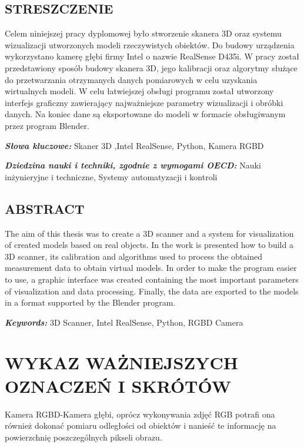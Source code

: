 \documentclass{pginz}
\providecommand{\keywordspl}[1]
{
  \small	
  \textbf{\textit{Słowa kluczowe:}} #1
}
\providecommand{\keywordseng}[1]
{
  \small	
  \textbf{\textit{Keywords:}} #1 
}
\providecommand{\dnauki}[1]
{
  \small	
  \textbf{\textit{Dziedzina nauki i techniki, zgodnie z wymogami OECD:}} #1
}
\begin{document}




\setcounter{page}{3}

 
\section*{STRESZCZENIE}
Celem niniejszej pracy dyplomowej było stworzenie skanera 3D oraz systemu wizualizacji utworzonych modeli rzeczywistych obiektów. Do budowy urządzenia wykorzystano kamerę głębi firmy Intel o nazwie RealSense D435i. W pracy został przedstawiony sposób budowy skanera 3D, jego kalibracji oraz algorytmy służące do przetwarzania otrzymanych danych pomiarowych w celu uzyskania wirtualnych modeli. W celu łatwiejszej obsługi programu został utworzony interfejs graficzny zawierający najważniejsze parametry wizualizacji i obróbki danych. Na koniec dane są eksportowane do modeli w formacie obsługiwanym przez program Blender.

\keywordspl{Skaner 3D ,Intel RealSense, Python, Kamera RGBD}

\dnauki{Nauki inżynieryjne i techniczne, Systemy automatyzacji i kontroli }

\section*{ABSTRACT}
The aim of this thesis was to create a 3D scanner and a system for visualization of created models based on real objects. In the work is presented how to build a 3D scanner, its calibration and algorithms used to process the obtained measurement data to obtain virtual models. In order to make the program easier to use, a graphic interface was created containing the most important parameters of visualization and data processing. Finally, the data are exported to the models in a format supported by the Blender program.

\keywordseng{3D Scanner, Intel RealSense, Python, RGBD Camera}
\newpage
\tableofcontents


\newpage

\chapter{WYKAZ WAŻNIEJSZYCH OZNACZEŃ I SKRÓTÓW}

Kamera RGBD-Kamera głębi, oprócz wykonywania zdjęć RGB potrafi ona również dokonać pomiaru odległości od obiektów i nanieść te informację na powierzchnię poszczególnych pikseli obrazu.
\end{document}
